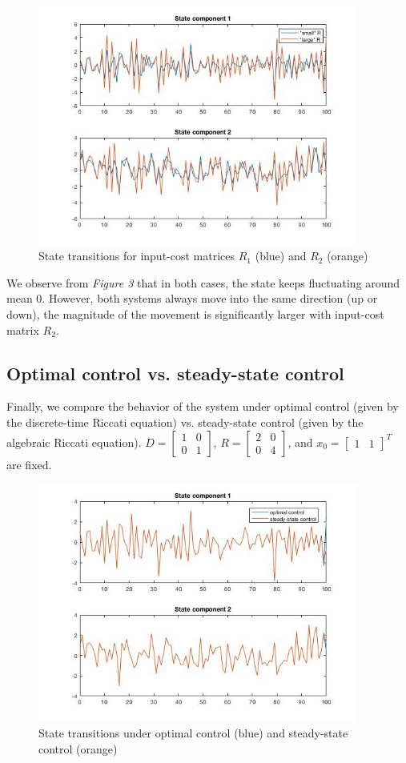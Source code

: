 \documentclass[11pt, oneside]{article}   	%
\begin{document}
\begin{figure}[ht!]
\centering
\includegraphics[width=105mm]{../plots/iv.jpg}
\caption{State transitions for input-cost matrices $R_1$ (blue) and $R_2$ (orange)}
\end{figure}

We observe from \textit{Figure 3} that in both cases, the state keeps fluctuating around mean 0. However, both systems always move into the same direction (up or down), the magnitude of the movement is significantly larger with input-cost matrix $R_2$.

\subsection{Optimal control vs. steady-state control}
Finally, we compare the behavior of the system under optimal control (given by the discrete-time Riccati equation) vs. steady-state control (given by the algebraic Riccati equation). $D = \begin{bmatrix} 1 & 0 \\[0.3em] 0 & 1\end{bmatrix}$, $R = \begin{bmatrix} 2 & 0 \\[0.3em] 0 & 4 \end{bmatrix}$, and $x_0 = \begin{bmatrix} 1 & 1 \end{bmatrix}^T$ are fixed. \\

\begin{figure}[ht!]
\centering
\includegraphics[width=105mm]{../plots/v.jpg}
\caption{State transitions under optimal control (blue) and steady-state control (orange)}
\end{figure}
\end{document}
